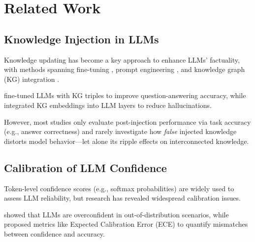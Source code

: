 \section{Related Work}


\subsection{Knowledge Injection in LLMs}
Knowledge updating has become a key approach to enhance LLMs' factuality, with methods spanning fine-tuning \cite{zhu2020modifying}, prompt engineering \cite{wei2022chain}, and knowledge graph (KG) integration \cite{pan2024roadmap, yasunaga2021qagnn}. 


\citet{bosselut2019comet} fine-tuned LLMs with KG triples to improve question-answering accuracy, while \citet{yasunaga2021qagnn} integrated KG embeddings into LLM layers to reduce hallucinations. 

However, most studies only evaluate post-injection performance via task accuracy (e.g., answer correctness) and rarely investigate how \emph{false} injected knowledge distorts model behavior—let alone its ripple effects on interconnected knowledge.


\subsection{Calibration of LLM Confidence}
Token-level confidence scores (e.g., softmax probabilities) are widely used to assess LLM reliability, but research has revealed widespread calibration issues. 

\citet{kadavath2022language} showed that LLMs are overconfident in out-of-distribution scenarios, while \citet{guo2017calibration} proposed metrics like Expected Calibration Error (ECE) to quantify mismatches between confidence and accuracy. 

